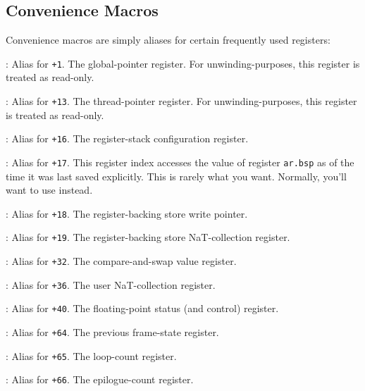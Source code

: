 \documentclass{article}
\begin{document}
\subsection{Convenience Macros}

Convenience macros are simply aliases for certain frequently used
registers:
\begin{Description}
\item[\Const{UNW\_IA64\_GP}:] Alias for \texttt{+1}.
  The global-pointer register.  For unwinding-purposes, this register
  is treated as read-only.
\item[\Const{UNW\_IA64\_TP}:] Alias for \texttt{+13}.
  The thread-pointer register.  For unwinding-purposes, this register is
  treated as read-only.
\item[\Const{UNW\_IA64\_AR\_RSC}:] Alias for \texttt{+16}.
  The register-stack configuration register.
\item[\Const{UNW\_IA64\_AR\_BSP}:] Alias for
  \texttt{+17}.  This register index accesses the
  value of register \texttt{ar.bsp} as of the time it was last saved
  explicitly.  This is rarely what you want.  Normally, you'll want to
  use  instead.
\item[\Const{UNW\_IA64\_AR\_BSPSTORE}:] Alias for \texttt{+18}.
  The register-backing store write pointer.
\item[\Const{UNW\_IA64\_AR\_RNAT}:] Alias for \texttt{+19}.
  The register-backing store NaT-collection register.
\item[\Const{UNW\_IA64\_AR\_CCV}:] Alias for \texttt{+32}.
  The compare-and-swap value register.
\item[\Const{UNW\_IA64\_AR\_UNAT}:] Alias for \texttt{+36}.
  The user NaT-collection register.
\item[\Const{UNW\_IA64\_AR\_FPSR}:] Alias for \texttt{+40}.
  The floating-point status (and control) register.
\item[\Const{UNW\_IA64\_AR\_PFS}:] Alias for \texttt{+64}.
  The previous frame-state register.
\item[\Const{UNW\_IA64\_AR\_LC}:] Alias for \texttt{+65}.
  The loop-count register.
\item[\Const{UNW\_IA64\_AR\_EC}:] Alias for \texttt{+66}.
  The epilogue-count register.
\end{Description}
\end{document}
